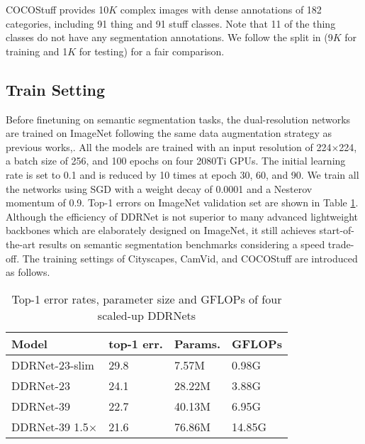 \documentclass[journal]{IEEEtran}
\begin{document}
COCOStuff\cite{caesar2018coco} provides 10$K$ complex images with dense annotations of 182 categories, including 91 thing and 91 stuff classes. Note that 11 of the thing classes do not have any segmentation annotations. We follow the split in \cite{caesar2018coco} (9$K$ for training and 1$K$ for testing) for a fair comparison.


\subsection{Train Setting}

Before finetuning on semantic segmentation tasks, the dual-resolution networks are trained on ImageNet\cite{russakovsky2015imagenet} following the same data augmentation strategy as previous works\cite{he2016deep},\cite{xie2017aggregated}. All the models are trained with an input resolution of 224$\times$224, a batch size of 256, and 100 epochs on four 2080Ti GPUs. The initial learning rate is set to 0.1 and is reduced by 10 times at epoch 30, 60, and 90. We train all the networks using SGD with a weight decay of 0.0001 and a Nesterov momentum of 0.9. Top-1 errors on ImageNet validation set are shown in Table \ref{tab:5}. Although the efficiency of DDRNet is not superior to many advanced lightweight backbones which are elaborately designed on ImageNet, it still achieves start-of-the-art results on semantic segmentation benchmarks considering a speed trade-off. The training settings of Cityscapes, CamVid, and COCOStuff are introduced as follows.

\begin{table}[]
\caption{Top-1 error rates, parameter size and GFLOPs of four scaled-up DDRNets}
\label{tab:5}
\begin{tabular}{p{70pt}p{33pt}<{\centering}p{55pt}<{\centering}p{45pt}<{\centering}}
\toprule
Model                    & top-1 err.           & Params.              & GFLOPs        \\ \midrule
DDRNet-23-slim           & 29.8                 & 7.57M                & 0.98G               \\ \midrule
DDRNet-23                & 24.1                 & 28.22M               & 3.88G               \\ \midrule
DDRNet-39                & 22.7                 & 40.13M               & 6.95G               \\ \midrule
DDRNet-39 1.5$\times$    & 21.6                 & 76.86M               & 14.85G              \\ \bottomrule
\end{tabular}
\end{table}
\end{document}
